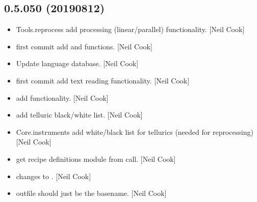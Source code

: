 \documentclass[a4paper,10pt,english]{report}
\begin{document}
\subsection{0.5.050 (2019\sphinxhyphen{}08\sphinxhyphen{}12)}
\label{\detokenize{misc/changelog:id111}}\begin{itemize}
\item {} 
Tools.reprocess \sphinxhyphen{} add processing (linear/parallel) functionality.
{[}Neil Cook{]}

\item {} 
 \sphinxhyphen{} first commit \sphinxhyphen{} add  and
 functions. {[}Neil Cook{]}

\item {} 
Update language database. {[}Neil Cook{]}

\item {} 
 \sphinxhyphen{} first commit \sphinxhyphen{} add text reading functionality. {[}Neil
Cook{]}

\item {} 
 \sphinxhyphen{} add  functionality. {[}Neil Cook{]}

\item {} 
 \sphinxhyphen{} add telluric black/white list. {[}Neil
Cook{]}

\item {} 
Core.instruments \sphinxhyphen{} add white/black list for tellurics (needed for
reprocessing) {[}Neil Cook{]}

\item {} 
 \sphinxhyphen{} get recipe definitions module from call.
{[}Neil Cook{]}

\item {} 
 \sphinxhyphen{} changes to . {[}Neil Cook{]}

\item {} 
 \sphinxhyphen{} outfile should just be the basename. {[}Neil
Cook{]}

\end{itemize}
\end{document}
